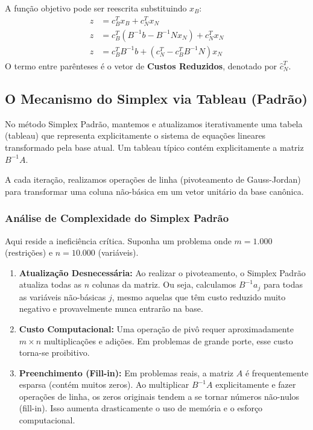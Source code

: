 \documentclass[12pt, a4paper]{article}
\begin{document}
A função objetivo pode ser reescrita substituindo $x_B$:
\begin{align}
    z &= c_B^T x_B + c_N^T x_N \\
    z &= c_B^T (B^{-1}b - B^{-1}Nx_N) + c_N^T x_N \\
    z &= c_B^T B^{-1}b + (c_N^T - c_B^T B^{-1}N)x_N
\end{align}
O termo entre parênteses é o vetor de \textbf{Custos Reduzidos}, denotado por $\hat{c}_N^T$.

\subsection{O Mecanismo do Simplex via Tableau (Padrão)}
No método Simplex Padrão, mantemos e atualizamos iterativamente uma tabela (tableau) que representa explicitamente o sistema de equações lineares transformado pela base atual. Um tableau típico contém explicitamente a matriz $B^{-1}A$.

A cada iteração, realizamos operações de linha (pivoteamento de Gauss-Jordan) para transformar uma coluna não-básica em um vetor unitário da base canônica.

\subsubsection{Análise de Complexidade do Simplex Padrão}
Aqui reside a ineficiência crítica. Suponha um problema onde $m=1.000$ (restrições) e $n=10.000$ (variáveis).

\begin{enumerate}
    \item \textbf{Atualização Desnecessária:} Ao realizar o pivoteamento, o Simplex Padrão atualiza todas as $n$ colunas da matriz. Ou seja, calculamos $B^{-1}a_j$ para todas as variáveis não-básicas $j$, mesmo aquelas que têm custo reduzido muito negativo e provavelmente nunca entrarão na base.
    
    \item \textbf{Custo Computacional:} Uma operação de pivô requer aproximadamente $m \times n$ multiplicações e adições. Em problemas de grande porte, esse custo torna-se proibitivo.
    
    \item \textbf{Preenchimento (Fill-in):} Em problemas reais, a matriz $A$ é frequentemente esparsa (contém muitos zeros). Ao multiplicar $B^{-1}A$ explicitamente e fazer operações de linha, os zeros originais tendem a se tornar números não-nulos (fill-in). Isso aumenta drasticamente o uso de memória e o esforço computacional.
\end{enumerate}
\end{document}
